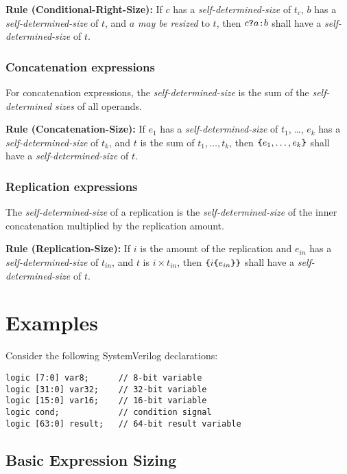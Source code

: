 \documentclass{article}
\newcommand{\sds}{\emph{self-determined-size}}
\newcommand{\mbr}{\emph{may be resized}}
\newenvironment{typingrule}[1]%
{\par\noindent\textbf{Rule (#1):} }%
{\par}
\begin{document}
\begin{typingrule}{Conditional-Right-Size}
  If $c$ has a \sds{} of $t_{c}$, $b$ has a
  \sds{} of $t$, and $a$ \mbr{} to $t$,
  then $c \verb|?| a \verb|:| b$ shall have a \sds{} of
  $t$.
\end{typingrule}

\subsubsection{Concatenation expressions}%

For concatenation expressions, the \sds{} is the sum of the
\emph{self-determined sizes} of all operands.

\begin{typingrule}{Concatenation-Size}
  If $e_{1}$ has a \sds{} of $t_{1}$, \ldots, $e_{k}$ has a
  \sds{} of $t_{k}$, and $t$ is the sum of
  $t_{1}, \dots, t_{k}$, then $\verb|{|e_{1}, \dots, e_{k}\verb|}|$ shall have
  a \sds{} of $t$.
\end{typingrule}

\subsubsection{Replication expressions}%

The \sds{} of a replication is the
\sds{} of the inner concatenation multiplied by the
replication amount.

\begin{typingrule}{Replication-Size}
  If $i$ is the amount of the replication and $e_{in}$ has a
  \sds{} of $t_{in}$, and $t$ is $i \times t_{in}$, then
  $\verb|{| i \verb|{| e_{in}\verb|}}|$ shall have a
  \sds{} of $t$.
\end{typingrule}

\section{Examples}

Consider the following SystemVerilog declarations:

\begin{verbatim}
logic [7:0] var8;      // 8-bit variable
logic [31:0] var32;    // 32-bit variable
logic [15:0] var16;    // 16-bit variable
logic cond;            // condition signal
logic [63:0] result;   // 64-bit result variable
\end{verbatim}

\subsection{Basic Expression Sizing}
\end{document}
